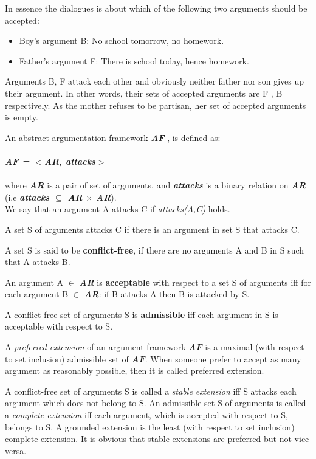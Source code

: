 In essence the dialogues is about which of the following two arguments should be accepted:
\begin{itemize}
    \item Boy’s argument B: No school tomorrow, no homework.
    \item Father’s argument F: There is school today, hence homework.
\end{itemize}

Arguments B, F attack each other and obviously neither father nor son gives
up their argument. In other words, their sets of accepted arguments are {F }, {B} respectively. As the mother refuses to be partisan, her set of accepted arguments is empty.


An abstract argumentation framework \textbf{\textit{AF}} \cite{dung1995}, is defined as: \\
\\
\textit{\textbf{ AF = $<$AR, attacks$>$}}\\
\\
where \textbf{\textit{AR}} is a pair of set of arguments, and   \textit{\textbf{attacks}} is a binary relation on \textbf{\textit{AR}} (i.e  \textit{\textbf{ attacks $\subseteq$ AR $\times$ AR}}). \\

We say that an argument A attacks C if \textit{attacks(A,C)} holds.

 A set S of arguments attacks C if there is an argument in set S that attacks C.

 
 A set S is said to be \textbf{conflict-free}, if there are no arguments A and B in S such that A attacks B. 


 An argument A $\in$ \textbf{\textit{AR}} is \textbf{acceptable} with respect to a set S of arguments iff for each argument B $\in$ \textbf{\textit{AR}}: if B attacks A then B is attacked by S.
 

 A conflict-free set of arguments S is \textbf{admissible} iff each argument in S is acceptable with respect to S.

 A \textit{preferred extension} of an argument framework \textbf{\textit{AF}} is a maximal (with respect to set inclusion) admissible set of \textbf{\textit{AF}}. When someone prefer to accept as many argument as reasonably possible, then it is called preferred extension.

 A conflict-free set of arguments S is called a \textit{stable extension} iff S attacks each argument which does not belong to S. An admissible set S of arguments is called a \textit{complete extension} iff each argument, which is accepted with respect to S, belongs to S. A grounded extension is the least (with respect to set inclusion) complete extension. It is obvious that stable extensions are preferred but not vice versa.






\FloatBarrier

